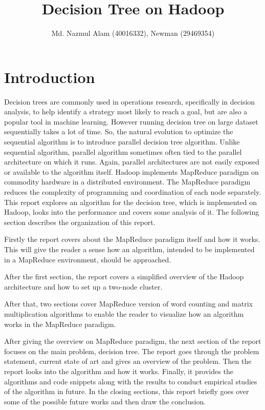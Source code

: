 \documentclass{article}
\title{Decision Tree on Hadoop}
\author{Md. Nazmul Alam (40016332), Newman (29469354)}
\begin{document}
\maketitle
\newpage
\tableofcontents
\listofalgorithms
\lstlistoflistings
{}
\newpage
\section{Introduction}


Decision trees are commonly used in operations research, specifically in decision analysis, to help identify a strategy most likely to reach a goal, but are also a popular tool in machine learning\cite{wikidt}. However running decision tree on large dataset sequentially takes a lot of time. So, the natural evolution to optimize the sequential algorithm is to introduce parallel decision tree algorithm. Unlike sequential algorithm, parallel algorithm sometimes often tied to the parallel architecture on which it runs. Again, parallel architectures are not easily exposed or available to the algorithm itself. Hadoop implements MapReduce paradigm on commodity hardware in a distributed environment. The MapReduce paradigm reduces the complexity of programming and coordination of each node separately.
\BlankLine This report explores an algorithm for the decision tree, which is implemented on Hadoop, looks into the performance and covers some analysis of it. The following section describes the organization of this report.\BlankLine

Firstly the report covers about the MapReduce paradigm itself and how it works. This will give the reader a sense how an algorithm, intended to be implemented in a MapReduce environment, should be approached.

After the first section, the report covers a simplified overview of the Hadoop architecture and how to set up a two-node cluster.

After that, two sections cover MapReduce version of word counting and matrix multiplication algorithms to enable the reader to visualize how an algorithm works in the MapReduce paradigm.

After giving the overview on MapReduce paradigm, the next section of the report focuses on the main problem, decision tree. The report goes through the problem statement, current state of art and gives an overview of the problem. Then the report looks into the algorithm and how it works. Finally, it provides the algorithms and code snippets along with the results to conduct empirical studies of the algorithm in future.
In the closing sections, this report briefly goes over some of the possible future works and then draw the conclusion.
\end{document}
